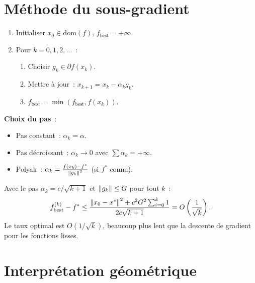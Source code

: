 \section{M\'ethode du sous-gradient}

\begin{algorithme}[title=\textbf{M\'ethode du sous-gradient}]
\begin{enumerate}
    \item Initialiser $x_0 \in \mathrm{dom}(f)$, $f_{\mathrm{best}} = +\infty$.
    \item Pour $k = 0, 1, 2, \ldots$~:
    \begin{enumerate}
        \item Choisir $g_k \in \partial f(x_k)$.
        \item Mettre \`a jour~: $x_{k+1} = x_k - \alpha_k g_k$.
        \item $f_{\mathrm{best}} = \min(f_{\mathrm{best}}, f(x_k))$.
    \end{enumerate}
\end{enumerate}
\textbf{Choix du pas}~:
\begin{itemize}
    \item Pas constant~: $\alpha_k = \alpha$.
    \item Pas d\'ecroissant~: $\alpha_k \to 0$ avec $\sum \alpha_k = +\infty$.
    \item Polyak~: $\alpha_k = \frac{f(x_k) - f^*}{\left\| g_k \right\|^2}$ (si $f^*$ connu).
\end{itemize}
\end{algorithme}

\begin{theoreme}
Avec le pas $\alpha_k = c/\sqrt{k+1}$ et $\left\| g_k \right\| \leq G$ pour tout $k$~:
\[
    f_{\mathrm{best}}^{(k)} - f^* \leq \frac{\left\| x_0 - x^* \right\|^2 + c^2 G^2 \sum_{i=0}^{k} 1}{2c\sqrt{k+1}} = O\left(\frac{1}{\sqrt{k}}\right).
\]
Le taux optimal est $O(1/\sqrt{k})$, beaucoup plus lent que la descente de gradient
pour les fonctions lisses.
\end{theoreme}

\section{Interpr\'etation g\'eom\'etrique}

